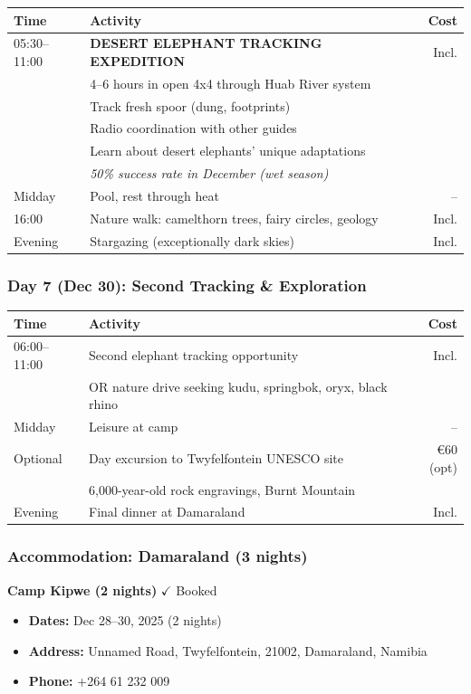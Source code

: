 \documentclass[11pt]{article}
\newcommand{\booked}{\textcolor{accentcolor}{$\checkmark$ Booked}}
\begin{document}
\begin{tabular}{llr}
\toprule
\textbf{Time} & \textbf{Activity} & \textbf{Cost} \\
\midrule
05:30--11:00 & \textbf{DESERT ELEPHANT TRACKING EXPEDITION} & Incl. \\
& 4--6 hours in open 4x4 through Huab River system & \\
& Track fresh spoor (dung, footprints) & \\
& Radio coordination with other guides & \\
& Learn about desert elephants' unique adaptations & \\
& \textit{50\% success rate in December (wet season)} & \\
Midday & Pool, rest through heat & -- \\
16:00 & Nature walk: camelthorn trees, fairy circles, geology & Incl. \\
Evening & Stargazing (exceptionally dark skies) & Incl. \\
\bottomrule
\end{tabular}

\subsubsection{Day 7 (Dec 30): Second Tracking \& Exploration}

\begin{tabular}{llr}
\toprule
\textbf{Time} & \textbf{Activity} & \textbf{Cost} \\
\midrule
06:00--11:00 & Second elephant tracking opportunity & Incl. \\
& OR nature drive seeking kudu, springbok, oryx, black rhino & \\
Midday & Leisure at camp & -- \\
Optional & Day excursion to Twyfelfontein UNESCO site & €60 (opt) \\
& 6,000-year-old rock engravings, Burnt Mountain & \\
Evening & Final dinner at Damaraland & Incl. \\
\bottomrule
\end{tabular}

\subsubsection{Accommodation: Damaraland (3 nights)}

\textbf{Camp Kipwe (2 nights)} \hfill \booked

\begin{itemize}
    \item \textbf{Dates:} Dec 28--30, 2025 (2 nights)
    \item \textbf{Address:} Unnamed Road, Twyfelfontein, 21002, Damaraland, Namibia
    \item \textbf{Phone:} +264 61 232 009
\end{itemize}
\end{document}
